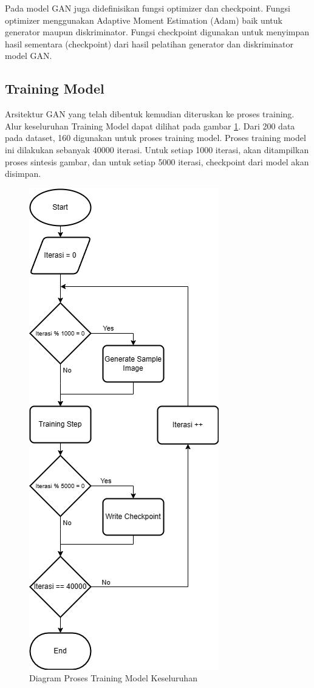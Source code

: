 Pada model GAN juga didefinisikan fungsi optimizer dan checkpoint.
Fungsi optimizer menggunakan Adaptive Moment Estimation (Adam) baik untuk generator maupun diskriminator. 
Fungsi checkpoint digunakan untuk menyimpan hasil sementara (checkpoint) dari hasil pelatihan generator dan diskriminator model GAN.

\subsection{Training Model}
\label{training}

Arsitektur GAN yang telah dibentuk kemudian diteruskan ke proses training. 
Alur keseluruhan Training Model dapat dilihat pada gambar \ref{fig:training}. 
Dari 200 data pada dataset, 160 digunakan untuk proses training model. 
Proses training model ini dilakukan sebanyak 40000 iterasi. 
Untuk setiap 1000 iterasi, akan ditampilkan proses sintesis gambar, dan untuk setiap 5000 iterasi, checkpoint dari model akan disimpan.

\begin{figure}[ht]
  \centering
  \includegraphics[scale=0.47]{gambar/Training_model.png}
  \caption{Diagram Proses Training Model Keseluruhan}
  \label{fig:training}
\end{figure}

